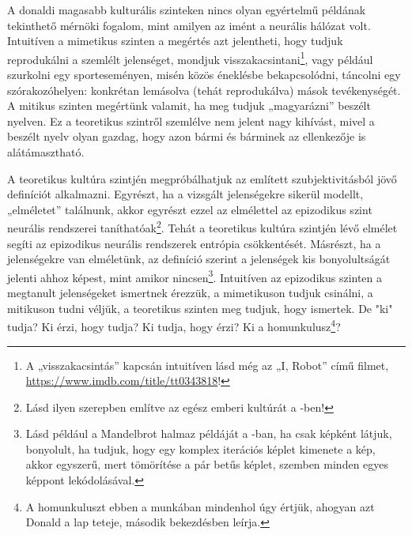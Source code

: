 \documentclass[a4paper]{article}
\begin{document}
A donaldi magasabb kulturális szinteken nincs olyan egyértelmű példának tekinthető mérnöki fogalom, mint amilyen az imént a neurális hálózat volt. Intuitíven a mimetikus szinten a megértés azt jelentheti, hogy tudjuk reprodukálni a szemlélt jelenséget, mondjuk visszakacsintani\footnote{A „visszakacsintás” kapcsán intuitíven lásd még az „I, Robot” című filmet, \url{https://www.imdb.com/title/tt0343818}!}, vagy például szurkolni egy sporteseményen, misén közös éneklésbe bekapcsolódni, táncolni egy szórakozóhelyen: konkrétan lemásolva (tehát reprodukálva) mások tevékenységét. A mitikus szinten megértünk valamit, ha meg tudjuk „magyarázni” beszélt nyelven. Ez a teoretikus szintről szemlélve nem jelent nagy kihívást, mivel a beszélt nyelv olyan gazdag, hogy azon bármi és bárminek az ellenkezője is alátámasztható.

A teoretikus kultúra szintjén megpróbálhatjuk az említett szubjektivitásból jövő definíciót alkalmazni. Egyrészt, ha a vizsgált jelenségekre sikerül modellt, „elméletet” találnunk, akkor egyrészt ezzel az elmélettel az epizodikus szint neurális rendszerei taníthatóak\footnote{Lásd ilyen szerepben említve az egész emberi kultúrát a \cite[35]{BN18}-ben!}. Tehát a teoretikus kultúra szintjén lévő elmélet segíti az epizodikus neurális rendszerek entrópia csökkentését. Másrészt, ha a jelenségekre van elméletünk, az definíció szerint a jelenségek kis bonyolultságát jelenti ahhoz képest, mint amikor nincsen\footnote{Lásd például a Mandelbrot halmaz példáját a \cite{BN18}-ban, ha csak képként látjuk, bonyolult, ha tudjuk, hogy egy komplex iterációs képlet kimenete a kép, akkor egyszerű, mert tömörítése a pár betűs képlet, szemben minden egyes képpont lekódolásával.}. Intuitíven az epizodikus szinten a megtanult jelenségeket ismertnek érezzük, a mimetikuson tudjuk csinálni, a mitikuson tudni véljük, a teoretikus szinten meg tudjuk, hogy ismertek. De "ki" tudja? Ki érzi, hogy tudja? Ki tudja, hogy érzi? Ki a homunkulusz\footnote{A homunkuluszt ebben a munkában mindenhol úgy értjük, ahogyan azt Donald a \cite[316]{Donald01} lap teteje, második bekezdésben leírja.}?
\end{document}
